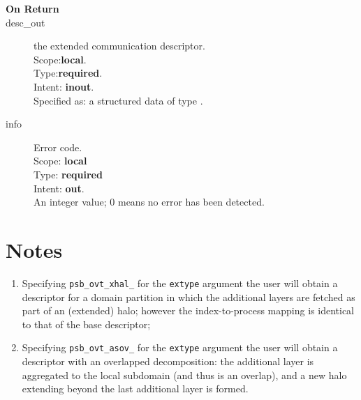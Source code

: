 \begin{description}
\item[\bf On Return]
\item[desc\_out] the extended communication descriptor.\\
Scope:{\bf local}.\\
Type:{\bf required}.\\
Intent: {\bf inout}.\\
Specified as: a structured data of type \descdata.
\item[info] Error code.\\
Scope: {\bf local} \\
Type: {\bf required} \\
Intent: {\bf out}.\\
An integer value; 0 means no error has been detected. 
\end{description}

\section*{Notes}
\begin{enumerate}
\item Specifying \verb|psb_ovt_xhal_| for the \verb|extype| argument
  the user will obtain a descriptor for a domain partition in which
  the additional layers are fetched as part of an (extended) halo;
  however the index-to-process mapping is identical to that of the
  base descriptor;
\item Specifying \verb|psb_ovt_asov_| for the \verb|extype| argument
  the user will obtain a descriptor with an overlapped decomposition:
  the additional layer is aggregated to  the local subdomain (and thus
  is an overlap), and a new halo extending beyond the last additional
  layer is formed. 
\end{enumerate}




